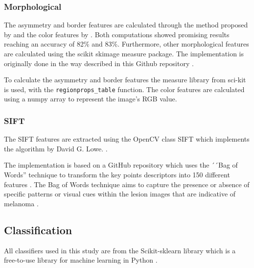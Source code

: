 \documentclass{kththesis}
\begin{document}
\subsubsection{Morphological} %


The asymmetry and border features are calculated through the method proposed by \parencite{inproceedings} and the color features by \parencite{celebi2008automatic}. Both computations showed promising results reaching an accuracy of 82\% and 83\%. Furthermore, other morphological features are calculated using the scikit skimage measure package. The implementation is originally done in the way described in this Github repository \parencite{melanoma-classifier}.

To calculate the asymmetry and border features the measure library from sci-kit is used, with the \verb|regionprops_table| function.
The color features are calculated using a numpy array to represent the image's RGB value.



\subsubsection{SIFT}

The SIFT features are extracted using the OpenCV class SIFT which implements the algorithm by David G. Lowe. \parencite{sift-opencv} \parencite{lowe2004distinctive}.

The implementation is based on a GitHub repository which uses the ´´Bag of Words'' technique to transform the key points descriptors into 150 different features \parencite{SIFT-repo}. The Bag of Words technique aims to capture the presence or absence of specific patterns or visual cues within the lesion images that are indicative of melanoma \parencite{9960177}.


\subsection{Classification}

All classifiers used in this study are from the Scikit-sklearn library which is a free-to-use library for machine learning in Python \parencite{scikit-learn-doc}.
\end{document}
